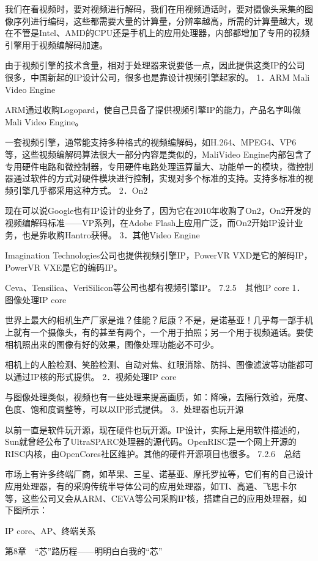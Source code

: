 \documentclass[12pt,UTF8]{ctexbook}
\begin{document}
我们在看视频时，要对视频进行解码，我们在用视频通话时，要对摄像头采集的图像序列进行编码，这些都需要大量的计算量，分辨率越高，所需的计算量越大，现在不管是Intel、AMD的CPU还是手机上的应用处理器，内部都增加了专用的视频引擎用于视频编解码加速。

由于视频引擎的技术含量，相对于处理器来说要低一点，因此提供这类IP的公司很多，中国新起的IP设计公司，很多也是靠设计视频引擎起家的。
1．ARM Mali Video Engine

ARM通过收购Logopard，使自己具备了提供视频引擎IP的能力，产品名字叫做Mali Video Engine。

一套视频引擎，通常能支持多种格式的视频编解码，如H.264、MPEG4、VP6等，这些视频编解码算法很大一部分内容是类似的，MaliVideo Engine内部包含了专用硬件电路和微控制器，专用硬件电路处理运算量大、功能单一的模块，微控制器通过软件的方式对硬件模块进行控制，实现对多个标准的支持。支持多标准的视频引擎几乎都采用这种方式。
2．On2

现在可以说Google也有IP设计的业务了，因为它在2010年收购了On2，On2开发的视频编解码标准——VP系列，在Adobe Flash上应用广泛，而On2开始IP设计业务，也是靠收购Hantro获得。
3．其他Video Engine

Imagination Technologies公司也提供视频引擎IP，PowerVR VXD是它的解码IP，PowerVR VXE是它的编码IP。

Ceva、Tensilica、VeriSilicon等公司也都有视频引擎IP。
7.2.5　其他IP core
1．图像处理IP core

世界上最大的相机生产厂家是谁？佳能？尼康？不是，是诺基亚！几乎每一部手机上就有一个摄像头，有的甚至有两个，一个用于拍照；另一个用于视频通话。要使相机照出来的图像有好的效果，图像处理功能必不可少。

相机上的人脸检测、笑脸检测、自动对焦、红眼消除、防抖、图像滤波等功能都可以通过IP核的形式提供。
2．视频处理IP core

与图像处理类似，视频也有一些处理来提高画质，如：降噪，去隔行效验，亮度、色度、饱和度调整等，可以以IP形式提供。
3．处理器也玩开源

以前一直是软件玩开源，现在硬件也玩开源。IP设计，实际上是用软件描述的，Sun就曾经公布了UltraSPARC处理器的源代码。OpenRISC是一个网上开源的RISC内核，由OpenCores社区维护。其他的硬件开源项目也很多。
7.2.6　总结

市场上有许多终端厂商，如苹果、三星、诺基亚、摩托罗拉等，它们有的自己设计应用处理器，有的采购传统半导体公司的应用处理器，如TI、高通、飞思卡尔等，这些公司又会从ARM、CEVA等公司采购IP核，搭建自己的应用处理器，如下图所示：

IP core、AP、终端关系


第8章　“芯”路历程——明明白白我的“芯”
\end{document}
